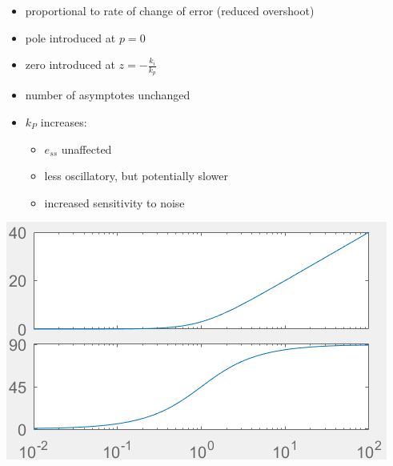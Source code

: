         \begin{minipage}{0.49\linewidth}
            \begin{itemize}
                \item proportional to rate of change of error (reduced overshoot)
                \item pole introduced at $p=0$
                \item zero introduced at $z = -\frac{k_i}{k_p}$
                \item number of asymptotes unchanged
                \item $k_P$ increases:
                \begin{itemize}
                    \item $e_{ss}$ unaffected
                    \item less oscillatory, but potentially slower
                    \item increased sensitivity to noise
                \end{itemize}
            \end{itemize}
        \end{minipage}
        \begin{minipage}{0.49\linewidth}
            \includegraphics[width = \linewidth]{src/images/PD-controller.png}
        \end{minipage}

